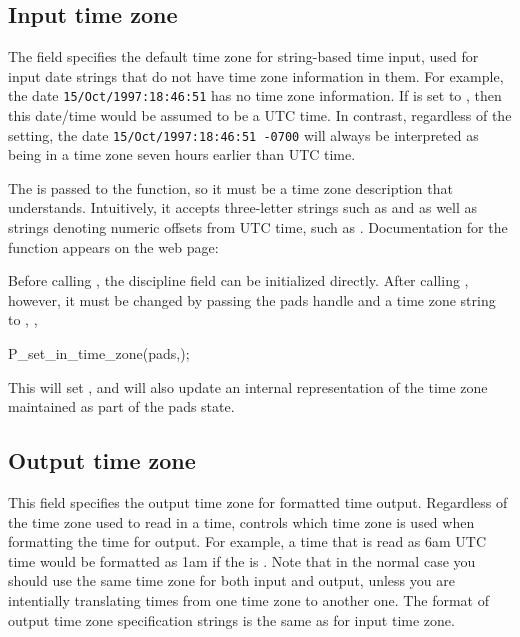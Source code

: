 \subsection{Input time zone}
\label{sec:library-customization-input-time-zone}
The field  specifies the default time zone for
string-based time input, used for input date strings 
that do not have time zone information in them.     For example, the date
\texttt{15/Oct/1997:18:46:51} has no time zone information.  If
 is set  to , 
then this date/time would be assumed to be a UTC time.
In contrast, regardless of the  setting, the date
\texttt{15/Oct/1997:18:46:51 -0700}
will always be interpreted as being in a time zone seven hours
earlier than UTC time.

The  is passed to the  function, so it
must be a time zone description that 
understands. Intuitively, it accepts three-letter strings such as 
  and   as well as strings
denoting numeric offsets from UTC time, such as .
Documentation for the  function appears on the web page:

Before calling , the discipline field 
can be initialized directly.  After calling , however, it
must be changed by passing the pads handle and a time zone string to 
, \eg{},

\begin{centercode}
    P\_set\_in\_time\_zone(pads,);
\end{centercode}

This will set , and will also update
an internal representation of the time zone maintained as part of
the pads state.

\subsection{Output time zone}
\label{sec:library-customization-output-time-zone}
This field specifies the output time zone for formatted time output.
Regardless of the time zone used to read in a time,
 controls which time zone is used when
formatting the time for output.  For example, a time that is read as 6am UTC time
would be formatted as 1am if the  is .
Note that in the normal case you should use the same time zone
for both input and output, unless you are intentially translating
times from one time zone to another one. The format of output time
zone specification strings is the same as for input time zone.

